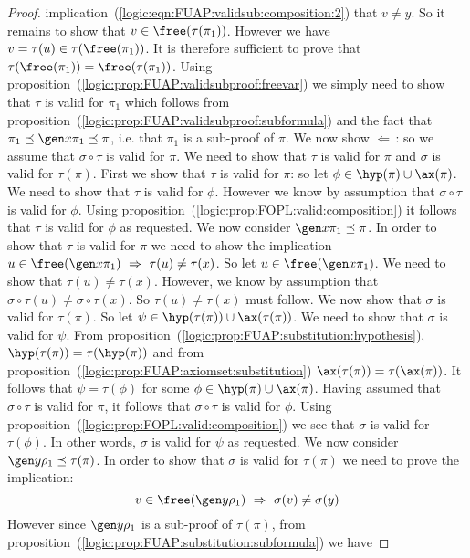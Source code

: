 \begin{proof}
implication~(\ref{logic:eqn:FUAP:validsub:composition:2}) that
$v\neq y$. So it remains to show that $v\in\free(\tau(\pi_{1}))$.
However we have $v=\tau(u)\in\tau(\free(\pi_{1}))$. It is therefore
sufficient to prove that
$\tau(\free(\pi_{1}))=\free(\tau(\pi_{1}))$. Using
proposition~(\ref{logic:prop:FUAP:validsubproof:freevar}) we simply
need to show that $\tau$ is valid for $\pi_{1}$ which follows from
proposition~(\ref{logic:prop:FUAP:validsubproof:subformula}) and the
fact that $\pi_{1}\preceq\gen x\pi_{1}\preceq\pi$, i.e. that
$\pi_{1}$ is a sub-proof of $\pi$. We now show $\Leftarrow$\,: so we
assume that $\sigma\circ\tau$ is valid for $\pi$. We need to show
that $\tau$ is valid for $\pi$ and $\sigma$ is valid for
$\tau(\pi)$. First we show that $\tau$ is valid for $\pi$: so let
$\phi\in\hyp(\pi)\cup\ax(\pi)$. We need to show that $\tau$ is valid
for $\phi$. However we know by assumption that $\sigma\circ\tau$ is
valid for $\phi$. Using
proposition~(\ref{logic:prop:FOPL:valid:composition}) it follows
that $\tau$ is valid for $\phi$ as requested. We now consider $\gen
x\pi_{1}\preceq\pi$. In order to show that $\tau$ is valid for $\pi$
we need to show the implication $u\in\free(\gen x\pi_{1})\
\Rightarrow\ \tau(u)\neq\tau(x)$. So let $u\in\free(\gen x\pi_{1})$.
We need to show that $\tau(u)\neq\tau(x)$. However, we know by
assumption that $\sigma\circ\tau(u)\neq\sigma\circ\tau(x)$. So
$\tau(u)\neq\tau(x)$ must follow. We now show that $\sigma$ is valid
for $\tau(\pi)$. So let $\psi\in\hyp(\tau(\pi))\cup\ax(\tau(\pi))$.
We need to show that $\sigma$ is valid for $\psi$. From
proposition~(\ref{logic:prop:FUAP:substitution:hypothesis}),
$\hyp(\tau(\pi))=\tau(\hyp(\pi))$ and from
proposition~(\ref{logic:prop:FUAP:axiomset:substitution})
$\ax(\tau(\pi))=\tau(\ax(\pi))$. It follows that $\psi=\tau(\phi)$
for some $\phi\in\hyp(\pi)\cup\ax(\pi)$. Having assumed that
$\sigma\circ\tau$ is valid for $\pi$, it follows that
$\sigma\circ\tau$ is valid for $\phi$. Using
proposition~(\ref{logic:prop:FOPL:valid:composition}) we see that
$\sigma$ is valid for $\tau(\phi)$. In other words, $\sigma$ is
valid for $\psi$ as requested. We now consider $\gen
y\rho_{1}\preceq\tau(\pi)$. In order to show that $\sigma$ is valid
for $\tau(\pi)$ we need to prove the implication:
    \begin{equation}\label{logic:eqn:FUAP:validsub:composition:4}
    v\in\free(\gen y\rho_{1})\ \Rightarrow\
    \sigma(v)\neq\sigma(y)
    \end{equation}
However since $\gen y\rho_{1}$ is a sub-proof of $\tau(\pi)$, from
proposition~(\ref{logic:prop:FUAP:substitution:subformula}) we have

\end{proof}
